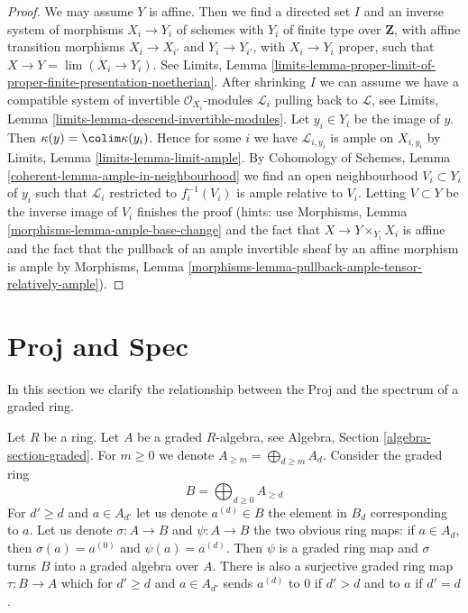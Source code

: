 \begin{proof}
We may assume $Y$ is affine. Then we find a directed set $I$
and an inverse system of morphisms $X_i \to Y_i$ of schemes
with $Y_i$ of finite type over $\mathbf{Z}$, with affine
transition morphisms $X_i \to X_{i'}$ and $Y_i \to Y_{i'}$,
with $X_i \to Y_i$ proper, such that $X \to Y = \lim (X_i \to Y_i)$.
See Limits, Lemma
\ref{limits-lemma-proper-limit-of-proper-finite-presentation-noetherian}.
After shrinking $I$ we can assume we have a compatible system of
invertible $\mathcal{O}_{X_i}$-modules $\mathcal{L}_i$
pulling back to $\mathcal{L}$, see
Limits, Lemma \ref{limits-lemma-descend-invertible-modules}.
Let $y_i \in Y_i$ be the image of $y$.
Then $\kappa(y) = \colim \kappa(y_i)$.
Hence for some $i$ we have $\mathcal{L}_{i, y_i}$
is ample on $X_{i, y_i}$ by
Limits, Lemma \ref{limits-lemma-limit-ample}.
By Cohomology of Schemes, Lemma \ref{coherent-lemma-ample-in-neighbourhood}
we find an open neighbourhood
$V_i \subset Y_i$ of $y_i$ such that
$\mathcal{L}_i$ restricted to $f_i^{-1}(V_i)$
is ample relative to $V_i$.
Letting $V \subset Y$ be the inverse image of
$V_i$ finishes the proof (hints: use
Morphisms, Lemma \ref{morphisms-lemma-ample-base-change} and
the fact that $X \to Y \times_{Y_i} X_i$ is affine
and the fact that the pullback of an
ample invertible sheaf by an affine morphism is ample by
Morphisms, Lemma \ref{morphisms-lemma-pullback-ample-tensor-relatively-ample}).
\end{proof}







\section{Proj and Spec}
\label{section-proj-spec}

\noindent
In this section we clarify the relationship between the Proj and the spectrum
of a graded ring.

\medskip\noindent
Let $R$ be a ring. Let $A$ be a graded $R$-algebra, see
Algebra, Section \ref{algebra-section-graded}.
For $m \geq 0$ we denote $A_{\geq m} = \bigoplus_{d \geq m} A_d$.
Consider the graded ring
$$
B = \bigoplus\nolimits_{d \geq 0} A_{\geq d}
$$
For $d' \geq d$ and $a \in A_{d'}$ let us denote $a^{(d)} \in B$
the element in $B_d$ corresponding to $a$.
Let us denote $\sigma : A \to B$ and $\psi : A \to B$
the two obvious ring maps: if $a \in A_d$, then
$\sigma(a) = a^{(0)}$ and $\psi(a) = a^{(d)}$.
Then $\psi$ is a graded ring map and $\sigma$ turns $B$
into a graded algebra over $A$. There is also a
surjective graded ring map $\tau : B \to A$
which for $d' \geq d$ and $a \in A_{d'}$ sends
$a^{(d)}$ to $0$ if $d' > d$ and to $a$ if $d' = d$.

